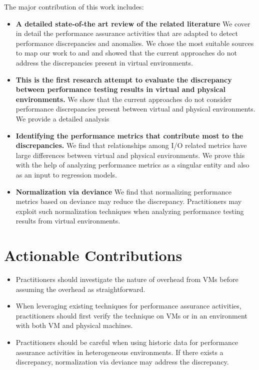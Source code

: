 The major contribution of this work includes: 
\begin{itemize} \itemsep -0.4pt 
	\item \textbf{A detailed state-of-the art review of the related literature} We cover in detail the performance assurance activities that are adapted to detect performance discrepancies and anomalies. We chose the most suitable  sources to map our work to and and showed that the current approaches do not address the discrepancies present in virtual environments.
	
	\item \textbf{This is the first research attempt to evaluate the discrepancy between performance testing results in virtual and physical environments.} We show that the current approaches do not consider performance discrepancies present between virtual and physical environments. We provide a detailed analysis 
	
	\item \textbf{Identifying the performance metrics that contribute most to the discrepancies.} We find that relationships among I/O related metrics have large differences between virtual and physical environments. We prove this with the help of analyzing performance metrics as a singular entity and also as an input to regression models.
	
	\item \textbf{Normalization via deviance} We find that normalizing performance metrics based on deviance may reduce the discrepancy. Practitioners may exploit such normalization techniques when analyzing performance testing results from virtual environments.
\end{itemize}

\section{Actionable Contributions}

\begin{itemize} \itemsep -0.4pt 
\item Practitioners should investigate the nature of overhead from VMs before assuming the overhead as straightforward.
\item When leveraging existing techniques for performance assurance activities, practitioners should first verify the technique on VMs or in an environment with both VM and physical machines.
\item Practitioners should be careful when using historic data for performance assurance activities in heterogeneous environments. If there exists a discrepancy, normalization via deviance may address the discrepancy.
	  
\end{itemize}

